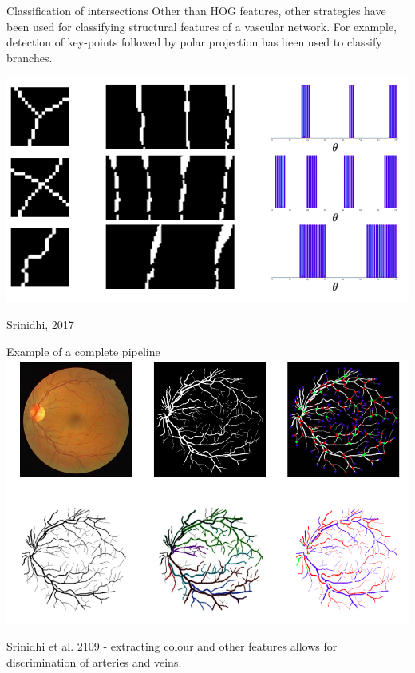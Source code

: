 \documentclass[9pt, aspectratio=169]{beamer}
\begin{document}
\begin{frame}
    {Classification of intersections}
    Other than HOG features, other strategies have been used for classifying structural features of a vascular network. For example, detection of key-points followed by polar projection has been used to classify branches.

    \centering
    \includegraphics[width=.7\textwidth]
    {polar_map_classification_intersections.png}

    \footnotesize
    \raggedright
    Srinidhi, 2017
\end{frame}

\begin{frame}
    {Example of a complete pipeline}
    \centering
    \includegraphics[width=.8\textwidth]{retina_pipeline.png}

    \footnotesize
    Srinidhi et al. 2109 - extracting colour and other features allows for discrimination of arteries and veins.
\end{frame}
\end{document}
